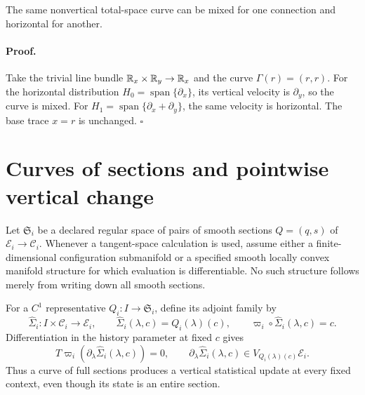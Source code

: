 The same nonvertical total-space curve can be mixed for one connection and
horizontal for another.  

\paragraph{Proof.}
Take the trivial line bundle
$\mathbb R_x\times\mathbb R_y\to\mathbb R_x$ and the curve
$\Gamma(r)=(r,r)$.  For the horizontal distribution
$H_0=\operatorname{span}\{\partial_x\}$, its vertical velocity is
$\partial_y$, so the curve is mixed.  For
$H_1=\operatorname{span}\{\partial_x+\partial_y\}$, the same velocity is
horizontal.  The base trace $x=r$ is unchanged.  $\square$

\section{Curves of sections and pointwise vertical change}
\label{sec:hist-section-curves}

Let $\mathfrak S_i$ be a declared regular space of pairs of smooth sections
$Q=(q,s)$ of $\mathcal E_i\to\mathcal C_i$.  Whenever a tangent-space
calculation is used, assume either a finite-dimensional configuration
submanifold or a specified smooth locally convex manifold structure for
which evaluation is differentiable.  No such structure follows merely from
writing down all smooth sections.  

For a $C^1$ representative $Q_i:I\to\mathfrak S_i$, define its adjoint
family by
\begin{equation}
\widehat\Sigma_i:I\times\mathcal C_i\longrightarrow\mathcal E_i,
\qquad
\widehat\Sigma_i(\lambda,c)=Q_i(\lambda)(c),
\qquad
\varpi_i\circ\widehat\Sigma_i(\lambda,c)=c.
\label{eq:hist-adjoint-section-family}
\end{equation}
Differentiation in the history parameter at fixed $c$ gives
\begin{equation}
T\varpi_i\left(\partial_\lambda\widehat\Sigma_i(\lambda,c)\right)=0,
\qquad
\partial_\lambda\widehat\Sigma_i(\lambda,c)
\in V_{Q_i(\lambda)(c)}\mathcal E_i.
\label{eq:hist-pointwise-history-verticality}
\end{equation}
Thus a curve of full sections produces a vertical statistical update at
every fixed context, even though its state is an entire section.

